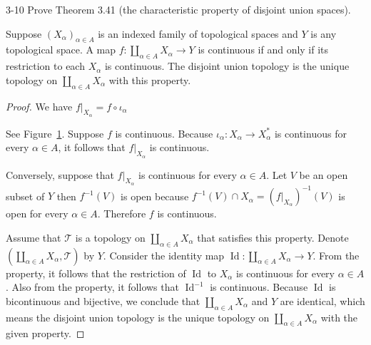 \begin{problem}{3-10}
Prove Theorem 3.41 (the characteristic property of disjoint union spaces).

Suppose ${(X_{\alpha})}_{\alpha\in A}$ is an indexed family of topological spaces and $Y$ is any topological space. A map $f: \coprod_{\alpha\in A}X_{\alpha}\to Y$ is continuous if and only if its restriction to each $X_{\alpha}$ is continuous. The disjoint union topology is the unique topology on $\coprod_{\alpha\in A}X_{\alpha}$ with this property.
\end{problem}

\begin{proof}
    We have $f\vert_{X_{\alpha}} = f\circ \iota_{\alpha}$

    See Figure~\ref{fig:3-10}. Suppose $f$ is continuous. Because $\iota_{\alpha}: X_{\alpha} \to X_{\alpha}^{*}$ is continuous for every $\alpha\in A$, it follows that $f\vert_{X_{\alpha}}$ is continuous.

    Conversely, suppose that $f\vert_{X_{\alpha}}$ is continuous for every $\alpha\in A$. Let $V$ be an open subset of $Y$ then $f^{-1}(V)$ is open because $f^{-1}(V) \cap X_{\alpha} = {(f\vert_{X_{\alpha}})}^{-1}(V)$ is open for every $\alpha\in A$. Therefore $f$ is continuous.
    \begin{figure}[htp]
        \renewcommand{\thefigure}{3-10}
        \centering
        \caption{}\label{fig:3-10}
    \end{figure}

    Assume that $\mathscr{T}$ is a topology on $\coprod_{\alpha\in A}X_{\alpha}$ that satisfies this property. Denote $\left(\coprod_{\alpha\in A}X_{\alpha}, \mathscr{T}\right)$ by $Y$. Consider the identity map $\operatorname{Id}: \coprod_{\alpha\in A}X_{\alpha}\to Y$. From the property, it follows that the restriction of $\operatorname{Id}$ to $X_{\alpha}$ is continuous for every $\alpha\in A$. Also from the property, it follows that $\operatorname{Id}^{-1}$ is continuous. Because $\operatorname{Id}$ is bicontinuous and bijective, we conclude that $\coprod_{\alpha\in A}X_{\alpha}$ and $Y$ are identical, which means the disjoint union topology is the unique topology on $\coprod_{\alpha\in A}X_{\alpha}$ with the given property.
\end{proof}


